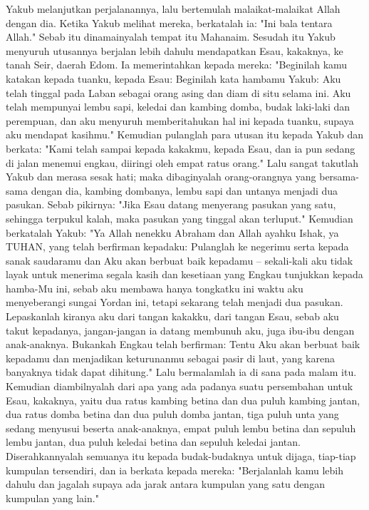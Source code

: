 \begin{biblechapter} %
 Yakub melanjutkan perjalanannya, lalu bertemulah malaikat-malaikat Allah dengan dia.
\verse Ketika Yakub melihat mereka, berkatalah ia: "Ini bala tentara Allah." Sebab itu dinamainyalah tempat itu Mahanaim.
\verse Sesudah itu Yakub menyuruh utusannya berjalan lebih dahulu mendapatkan Esau, kakaknya, ke tanah Seir, daerah Edom.
\verse Ia memerintahkan kepada mereka: "Beginilah kamu katakan kepada tuanku, kepada Esau: Beginilah kata hambamu Yakub: Aku telah tinggal pada Laban sebagai orang asing dan diam di situ selama ini.
\verse Aku telah mempunyai lembu sapi, keledai dan kambing domba, budak laki-laki dan perempuan, dan aku menyuruh memberitahukan hal ini kepada tuanku, supaya aku mendapat kasihmu."
\verse Kemudian pulanglah para utusan itu kepada Yakub dan berkata: "Kami telah sampai kepada kakakmu, kepada Esau, dan ia pun sedang di jalan menemui engkau, diiringi oleh empat ratus orang."
\verse Lalu sangat takutlah Yakub dan merasa sesak hati; maka dibaginyalah orang-orangnya yang bersama-sama dengan dia, kambing dombanya, lembu sapi dan untanya menjadi dua pasukan.
\verse Sebab pikirnya: "Jika Esau datang menyerang pasukan yang satu, sehingga terpukul kalah, maka pasukan yang tinggal akan terluput."
\verse Kemudian berkatalah Yakub: "Ya Allah nenekku Abraham dan Allah ayahku Ishak, ya TUHAN, yang telah berfirman kepadaku: Pulanglah ke negerimu serta kepada sanak saudaramu dan Aku akan berbuat baik kepadamu --
\verse sekali-kali aku tidak layak untuk menerima segala kasih dan kesetiaan yang Engkau tunjukkan kepada hamba-Mu ini, sebab aku membawa hanya tongkatku ini waktu aku menyeberangi sungai Yordan ini, tetapi sekarang telah menjadi dua pasukan.
\verse Lepaskanlah kiranya aku dari tangan kakakku, dari tangan Esau, sebab aku takut kepadanya, jangan-jangan ia datang membunuh aku, juga ibu-ibu dengan anak-anaknya.
\verse Bukankah Engkau telah berfirman: Tentu Aku akan berbuat baik kepadamu dan menjadikan keturunanmu sebagai pasir di laut, yang karena banyaknya tidak dapat dihitung."
\verse Lalu bermalamlah ia di sana pada malam itu. Kemudian diambilnyalah dari apa yang ada padanya suatu persembahan untuk Esau, kakaknya,
\verse yaitu dua ratus kambing betina dan dua puluh kambing jantan, dua ratus domba betina dan dua puluh domba jantan,
\verse tiga puluh unta yang sedang menyusui beserta anak-anaknya, empat puluh lembu betina dan sepuluh lembu jantan, dua puluh keledai betina dan sepuluh keledai jantan.
\verse Diserahkannyalah semuanya itu kepada budak-budaknya untuk dijaga, tiap-tiap kumpulan tersendiri, dan ia berkata kepada mereka: "Berjalanlah kamu lebih dahulu dan jagalah supaya ada jarak antara kumpulan yang satu dengan kumpulan yang lain."

\end{biblechapter}
